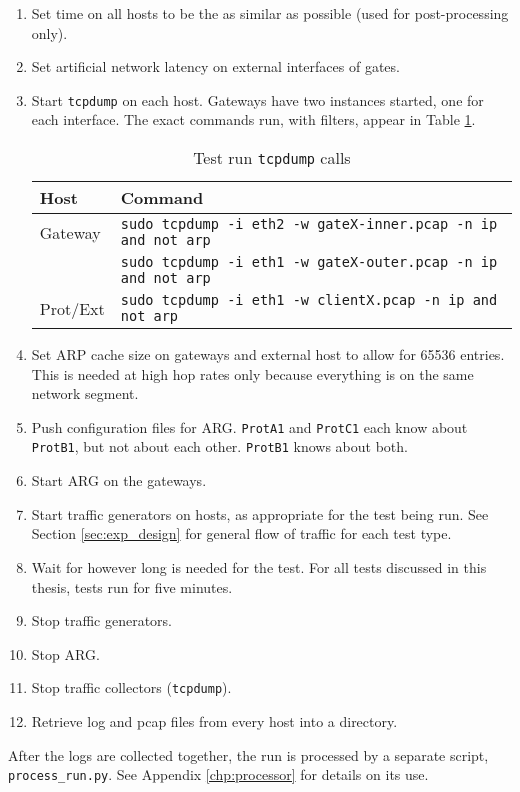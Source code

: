 \begin{enumerate}
\item Set time on all hosts to be the as similar as possible (used for post-processing only).
\item Set artificial network latency on external interfaces of gates.
\item Start \texttt{tcpdump} on each host. Gateways have two instances started, one for each interface. The exact commands run, with filters, appear in Table \ref{tbl:test_tcpdump_calls}.
\begin{table}
\caption{Test run \texttt{tcpdump} calls}
\label{tbl:test_tcpdump_calls}
\centering
\begin{tabular}{l|l}
Host & Command\\
\hline
Gateway & \texttt{sudo tcpdump -i eth2 -w gateX-inner.pcap -n ip and not arp}\\
	& \texttt{sudo tcpdump -i eth1 -w gateX-outer.pcap -n ip and not arp}\\
\hline
Prot/Ext & \texttt{sudo tcpdump -i eth1 -w clientX.pcap -n ip and not arp}
\end{tabular}
\end{table}

\item Set \ac{ARP} cache size on gateways and external host to allow for 65536 entries. This is needed at high hop rates only because everything is on the same network segment.
\item Push configuration files for \ac{ARG}. \texttt{ProtA1} and \texttt{ProtC1} each know about \texttt{ProtB1}, but not about each other. \texttt{ProtB1} knows about both.
\item Start \ac{ARG} on the gateways. 
\item Start traffic generators on hosts, as appropriate for the test being run. See Section \ref{sec:exp_design} for general flow of traffic for each test type.
\item Wait for however long is needed for the test. For all tests discussed in this thesis, tests run for five minutes.
\item Stop traffic generators.
\item Stop \ac{ARG}.
\item Stop traffic collectors (\texttt{tcpdump}).
\item Retrieve log and pcap files from every host into a directory.
\end{enumerate}

\par After the logs are collected together, the run is processed by a separate script, \texttt{process\_run.py}. See Appendix \ref{chp:processor} for details on its use. 

